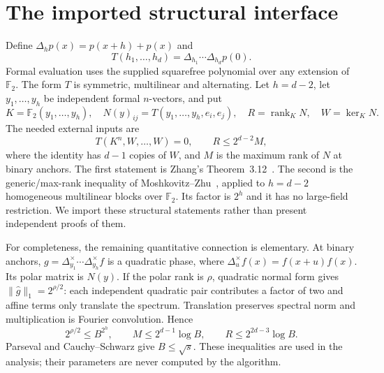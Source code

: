 \documentclass[11pt]{article}
\theoremstyle{remark}\newtheorem{remark}[theorem]{Remark}
\newcommand{\F}{\mathbb F}
\newcommand{\rank}{\operatorname{rank}}
\begin{document}
\section{The imported structural interface}
Define $\Delta_h p(x)=p(x+h)+p(x)$ and
\[
 T(h_1,\ldots,h_d)=\Delta_{h_1}\cdots\Delta_{h_d}p(0).
\]
Formal evaluation uses the supplied squarefree polynomial over any extension of $\F_2$. The form $T$ is symmetric, multilinear and alternating. Let $h=d-2$, let $y_1,\ldots,y_h$ be independent formal $n$-vectors, and put
\[
 K=\F_2(y_1,\ldots,y_h),\quad
 N(y)_{ij}=T(y_1,\ldots,y_h,e_i,e_j),\quad
 R=\rank_K N,\quad W=\ker_K N.
\]
The needed external inputs are
\begin{equation}\label{eq:imports}
 T(K^n,W,\ldots,W)=0,\qquad
 R\le 2^{d-2}M,
\end{equation}
where the identity has $d-1$ copies of $W$, and $M$ is the maximum rank of $N$ at binary anchors.
The first statement is Zhang's Theorem~3.12~\cite{Z26}. The second is the generic/max-rank inequality of Moshkovitz--Zhu~\cite{MZ}, applied to $h=d-2$ homogeneous multilinear blocks over $\F_2$. Its factor is $2^h$ and it has no large-field restriction. We import these structural statements rather than present independent proofs of them.

For completeness, the remaining quantitative connection is elementary.
At binary anchors, $g=\Delta^\times_{y_1}\cdots\Delta^\times_{y_h}f$ is a quadratic phase, where $\Delta^\times_u f(x)=f(x+u)f(x)$. Its polar matrix is $N(y)$.
If the polar rank is $\rho$, quadratic normal form gives $\|\widehat g\|_1=2^{\rho/2}$: each independent quadratic pair contributes a factor of two and affine terms only translate the spectrum.
Translation preserves spectral norm and multiplication is Fourier convolution. Hence
\[
 2^{\rho/2}\le B^{2^h},\qquad
 M\le2^{d-1}\log B,\qquad R\le2^{2d-3}\log B.
\]
Parseval and Cauchy--Schwarz give $B\le\sqrt{s}$.
These inequalities are used in the analysis; their parameters are never computed by the algorithm.
\end{document}
